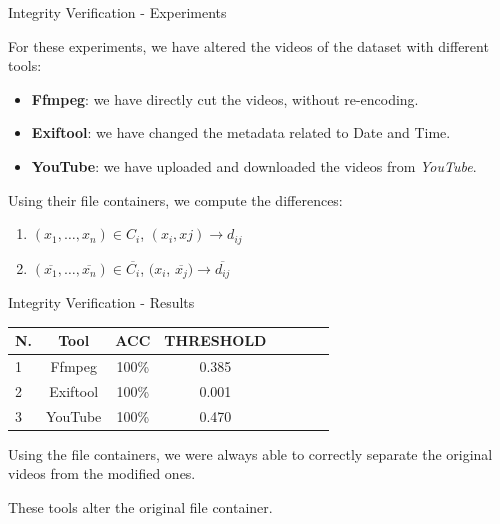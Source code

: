 \begin{tframe}{Integrity Verification - Experiments}

For these experiments, we have altered the videos of the dataset with different tools:

\begin{itemize}
\item \textbf{Ffmpeg}: we have directly cut the videos, without re-encoding.
\vspace{0.1cm}
\item \textbf{Exiftool}: we have changed the metadata related to Date and Time.
\vspace{0.1cm}
\item \textbf{YouTube}: we have uploaded and downloaded the videos from \emph{YouTube}.
\end{itemize}

\vspace{0.5cm}

Using their file containers, we compute the differences:

\begin{enumerate}

\item $(x_{1},\ldots,x_{n}) \in C_{i}$, $(x_{i}, x{j}) \rightarrow d_{ij}$
\vspace{0.1cm}
\item $(\overline{x_{1}},\ldots,\overline{x_{n}}) \in \overline{C_{i}}$, $(x_{i}$, $\overline{x_{j}}) \rightarrow \overline{d_{ij}}$ 

\end{enumerate}

\end{tframe}

\begin{tframe}{Integrity Verification - Results}

\begin{footnotesize}
\begin{table}[h!]
\centering
\begin{tabular}{l c c c c c c c} 
\hline \hline 
\textbf{N.} & \textbf{Tool} & \textbf{ACC} & \textbf{THRESHOLD}\\ [0.5ex]
\hline
1 & Ffmpeg & 100\% & 0.385\\
2 & Exiftool & 100\% &	0.001 \\
3 &	YouTube & 100\% & 0.470 \\ 

\hline
\end{tabular}
\end{table}
\end{footnotesize}

\vspace{0.2cm}
Using the file containers, we were always able to correctly separate the original videos from the modified ones.

\vspace{0.5cm}
These tools alter the original file container.

\end{tframe}

